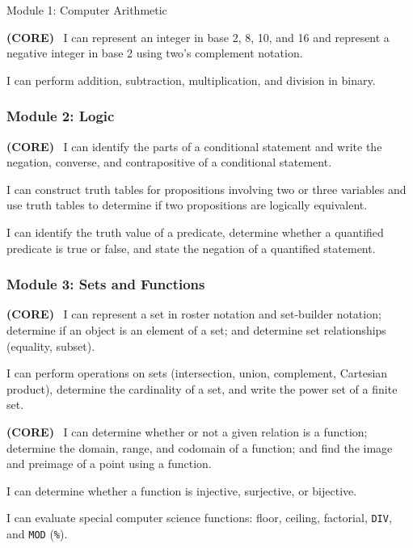 \documentclass[]{article}
\providecommand{\tightlist}{%
  \setlength{\itemsep}{0pt}\setlength{\parskip}{0pt}}
\begin{document}
\begin{subsubsection}{Module 1: Computer Arithmetic}
\begin{description}
\tightlist
    \item[CA.1] \textbf{(CORE)} \ I can represent an integer in base 2, 8, 10, and 16 and represent a negative integer in base 2 using two's complement notation.
    \item[CA.2] I can perform addition, subtraction, multiplication, and division in binary. 
\end{description}

\subsubsection{Module 2: Logic}
\begin{description}
\tightlist
    \item[L.1] \textbf{(CORE)} \ I can identify the parts of a conditional statement and write the negation, converse, and contrapositive of a conditional statement.
    \item[L.2] I can construct truth tables for propositions involving two or three variables and use truth tables to determine if two propositions are logically equivalent.
    \item[L.3] I can identify the truth value of a predicate, determine whether a quantified predicate is true or false, and state the negation of a quantified statement. 
\end{description}

\subsubsection{Module 3: Sets and Functions}
\begin{description}
\tightlist
    \item[SF.1] \textbf{(CORE)} \ I can represent a set in roster notation and set-builder notation; determine if an object is an element of a set; and determine set relationships (equality, subset). 
    \item[SF.2] I can perform operations on sets (intersection, union, complement, Cartesian product), determine the cardinality of a set, and write the power set of a finite set.
    \item[SF.3] \textbf{(CORE)} \ I can determine whether or not a given relation is a function; determine the domain, range, and codomain of a function; and find the image and preimage of a point using a function. 
    \item[SF.4] I can determine whether a function is injective, surjective, or bijective.
    \item[SF.5] I can evaluate special computer science functions: floor, ceiling, factorial, \texttt{DIV}, and \texttt{MOD} (\texttt{\%}). 
\end{description}


\end{subsubsection}
\end{document}
